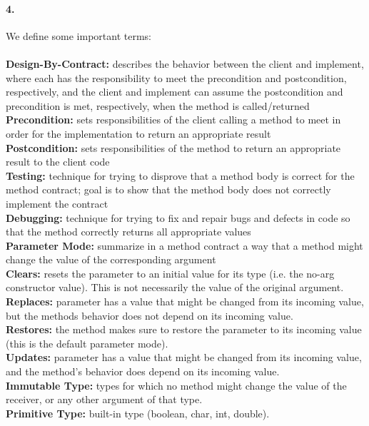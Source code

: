 \documentclass[10pt]{article}
\begin{document}
\paragraph{4. } We define some important terms: \\\\
\textbf{Design-By-Contract: } describes the behavior between the client and implement, where each has the responsibility to meet the precondition and postcondition, respectively, and the client and implement can assume the postcondition and precondition is met, respectively, when the method is called/returned\\
\textbf{Precondition: } sets responsibilities of the client calling a method to meet in order for the implementation to return an appropriate result \\
\textbf{Postcondition: } sets responsibilities of the method to return an appropriate result to the client code\\
\textbf{Testing: } technique for trying to disprove that a method body is correct for the method contract; goal is to show that the method body does not correctly implement the contract \\
\textbf{Debugging: } technique for trying to fix and repair bugs and defects in code so that the method correctly returns all appropriate values\\
\textbf{Parameter Mode: } summarize in a method contract a way that a method might change the value of the corresponding argument\\
\textbf{Clears: } resets the parameter to an initial value for its type (i.e. the no-arg constructor value). This is not necessarily the value of the original argument. \\
\textbf{Replaces: } parameter has a value that might be changed from its incoming value, but the methods behavior does not depend on its incoming value. \\
\textbf{Restores: } the method makes sure to restore the parameter to its incoming value (this is the default parameter mode). \\
\textbf{Updates: } parameter has a value that might be changed from its incoming value, and the method's behavior does depend on its incoming value. \\
\textbf{Immutable Type: } types for which no method might change the value of the receiver, or any other argument of that type. \\
\textbf{Primitive Type: } built-in type (boolean, char, int, double). \\
\end{document}
